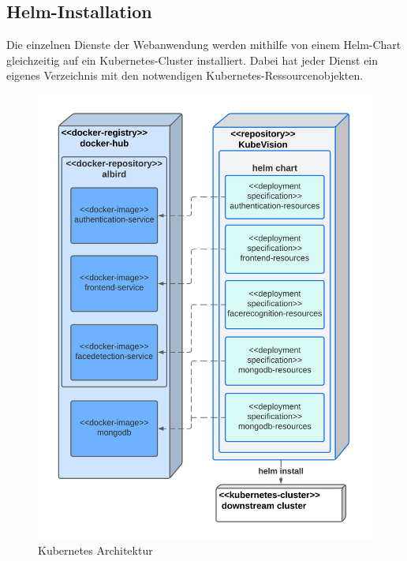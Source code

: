 \subsection{Helm-Installation}

Die einzelnen Dienste der Webanwendung werden mithilfe von einem Helm-Chart gleichzeitig auf ein Kubernetes-Cluster installiert.
Dabei hat jeder Dienst ein eigenes Verzeichnis mit den notwendigen Kubernetes-Ressourcenobjekten.


\begin{figure}[!htb]
    \centering
    \includegraphics[width=0.8\columnwidth]{images/HelmDeployment.png}
    \caption{Kubernetes Architektur}
    \label{fig:HelmInstallation}
\end{figure}





